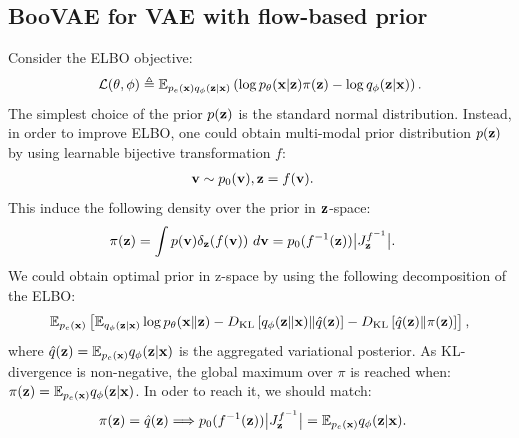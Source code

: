 \newpage
\subsection{BooVAE for VAE with flow-based prior}
\label{app:flowvae}
Consider the ELBO objective:
\begin{equation}
    \begin{aligned}
    \mathcal{L}(\theta, \phi) \triangleq  \mathbb{E}_{p_{e}({\mathbf{x}})q_{\phi}({\mathbf{z}}|{\mathbf{x}})}\left(\log p_{\theta}({\mathbf{x}}|{\mathbf{z}})\pi({\mathbf{z}}) - \log q_{\phi}({\mathbf{z}}|{\mathbf{x}})\right).
    \end{aligned}
\end{equation}
The simplest choice of the prior $p({\mathbf{z}})$ is the standard normal distribution. Instead, in order to improve ELBO, one could obtain multi-modal prior distribution $p({\mathbf{z}})$ by using learnable bijective transformation $f$:
\begin{equation}
    \begin{aligned}
    & {\mathbf{v}} \sim p_{0}({\mathbf{v}}), {\mathbf{z}} = f({\mathbf{v}}).
    \end{aligned}
\end{equation}
This induce the following density over the prior in ${\mathbf{z}}$-space:
\begin{equation}
    \begin{aligned}
    & \pi({\mathbf{z}}) = \int p({\mathbf{v}})\delta_{{\mathbf{z}}}(f({\mathbf{v}}))~d{\mathbf{v}} =  p_{0}(f^{-1}({\mathbf{z}}))\big|J^{f^{-1}}_{{\mathbf{z}}}\big|.
    \end{aligned}
\end{equation}
We could obtain optimal prior in z-space by using the following decomposition of the ELBO:
\begin{equation}
    \begin{aligned}
 \mathbb{E}_{p_{e}({\mathbf{x}})}\left[\mathbb{E}_{q_{\phi}({\mathbf{z}}|{\mathbf{x}})}\log p_{\theta}({\mathbf{x}}\|{\mathbf{z}})  -D_{\mathrm{KL}}\left[q_{\phi}({\mathbf{z}}\|{\mathbf{x}})\|\hat{q}({\mathbf{z}})\right] -D_{\mathrm{KL}}\left[\hat{q}({\mathbf{z}})\|\pi({\mathbf{z}})\right]\right],
    \end{aligned}
\end{equation}
where $\hat{q}({\mathbf{z}})=\mathbb{E}_{p_{e}({\mathbf{x}})}q_{\phi}({\mathbf{z}}|{\mathbf{x}})$ is the aggregated variational posterior. As KL-divergence is non-negative, the global maximum over $\pi$ is reached when: $\pi({\mathbf{z}})=\mathbb{E}_{p_{e}({\mathbf{x}})}q_{\phi}({\mathbf{z}}|{\mathbf{x}})$. In oder to reach it, we should match:
\begin{equation}
    \begin{aligned}
    \label{eq:match}
    & \pi(\rvz)=\hat{q}(\rvz) \Longrightarrow p_{0}(f^{-1}(\rvz))\big|J^{f^{-1}}_{\rvz}\big| =  \E_{p_{e}(\rvx)}q_{\phi}(\rvz|\rvx).
    \end{aligned}
\end{equation}
